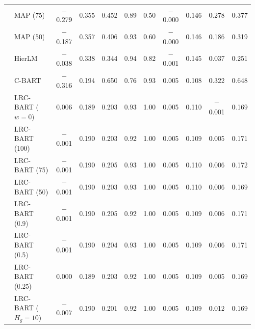 \begin{center}
\begin{longtable}{llccccccccc}
& MAP (75) & $-$0.279 & 0.355 & 0.452 & 0.89 & 0.50 & $-$0.000 & 0.146 & 0.278 & 0.377 \\
& MAP (50) & $-$0.187 & 0.357 & 0.406 & 0.93 & 0.60 & $-$0.000 & 0.146 & 0.186 & 0.319 \\
& HierLM & $-$0.038 & 0.338 & 0.344 & 0.94 & 0.82 & $-$0.001 & 0.145 & 0.037 & 0.251 \\
& C-BART & $-$0.316 & 0.194 & 0.650 & 0.76 & 0.93 & 0.005 & 0.108 & 0.322 & 0.648 \\
& LRC-BART ($w=0$) & 0.006 & 0.189 & 0.203 & 0.93 & 1.00 & 0.005 & 0.110 & $-$0.001 & 0.169 \\
& LRC-BART (100) & $-$0.001 & 0.190 & 0.203 & 0.92 & 1.00 & 0.005 & 0.109 & 0.005 & 0.171 \\
& LRC-BART (75) & $-$0.001 & 0.190 & 0.205 & 0.93 & 1.00 & 0.005 & 0.110 & 0.006 & 0.172 \\
& LRC-BART (50) & $-$0.001 & 0.190 & 0.203 & 0.93 & 1.00 & 0.005 & 0.110 & 0.006 & 0.169 \\
& LRC-BART (0.9) & $-$0.001 & 0.190 & 0.205 & 0.92 & 1.00 & 0.005 & 0.109 & 0.006 & 0.171 \\
& LRC-BART (0.5) & $-$0.001 & 0.190 & 0.204 & 0.93 & 1.00 & 0.005 & 0.109 & 0.006 & 0.171 \\
& LRC-BART (0.25) & 0.000 & 0.189 & 0.203 & 0.92 & 1.00 & 0.005 & 0.109 & 0.005 & 0.169 \\
& LRC-BART ($H_g=10$) & $-$0.007 & 0.190 & 0.201 & 0.92 & 1.00 & 0.005 & 0.109 & 0.012 & 0.169 \\
\end{longtable}
\end{center}

